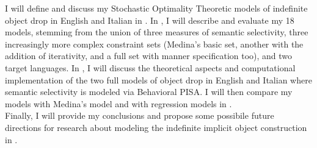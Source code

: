 I will define and discuss my Stochastic Optimality Theoretic models of indefinite object drop in English and Italian in . In , I will describe and evaluate my 18 models, stemming from the union of three measures of semantic selectivity, three increasingly more complex constraint sets (Medina's basic set, another with the addition of iterativity, and a full set with manner specification too), and two target languages. In , I will discuss the theoretical aspects and computational implementation of the two full models of object drop in English and Italian where semantic selectivity is modeled via Behavioral PISA. I will then compare my models with Medina's model and with regression models in .\\
Finally, I will provide my conclusions and propose some possibile future directions for research about modeling the indefinite implicit object construction in .



